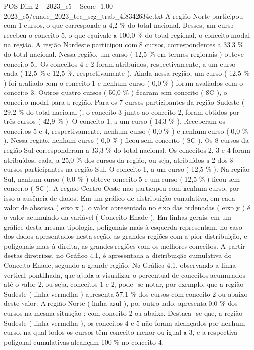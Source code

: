 \begin{textsample}{POS Dim 2 – 2023\_c5 – Score -1.00 – 2023\_c5/enade\_2023\_tec\_seg\_trab\_4f8342634e.txt}
A região Norte participou com 1 cursos, o que corresponde a 4,2 \% do total nacional.
Desses, um curso recebeu o conceito 5, o que equivale a 100,0 \% do total regional, o conceito modal na região.
A região Nordeste participou com 8 cursos, correspondentes a 33,3 \% do total nacional.
Nessa região, um curso ( 12,5 \% em termos regionais ) obteve conceito 5,.
Os conceitos 4 e 2 foram atribuídos, respectivamente, a um curso cada ( 12,5 \% e 12,5 \%, respectivamente ).
Ainda nessa região, um curso ( 12,5 \% ) foi avaliado com o conceito 1 e nenhum curso ( 0,0 \% ) foram avaliados com o conceito 3.
Outros quatro cursos ( 50,0 \% ) ficaram sem conceito ( SC ), o conceito modal para a região.
Para os 7 cursos participantes da região Sudeste ( 29,2 \% do total nacional ), o conceito 3 junto ao conceito 2, foram obtidos por três cursos ( 42,9 \% ).
O conceito 1, a um curso ( 14,3 \% ).
Receberam os conceitos 5 e 4, respectivamente, nenhum curso ( 0,0 \% ) e nenhum curso ( 0,0 \% ).
Nessa região, nenhum curso ( 0,0 \% ) ficou sem conceito ( SC ).
Os 8 cursos da região Sul corresponderam a 33,3 \% do total nacional.
Os conceitos 2, 3 e 4 foram atribuídos, cada, a 25,0 \% dos cursos da região, ou seja, atribuídos a 2 dos 8 cursos participantes na região Sul.
O conceito 1, a um curso ( 12,5 \% ).
Na região Sul, nenhum curso ( 0,0 \% ) obteve conceito 5 e um curso ( 12,5 \% ) ficou sem conceito ( SC ).
A região Centro-Oeste não participou com nenhum curso, por isso a ausência de dados.
Em um gráfico de distribuição cumulativa, em cada valor de abscissa ( eixo x ), o valor apresentado no eixo das ordenadas ( eixo y ) é o valor acumulado da variável ( Conceito Enade ).
Em linhas gerais, em um gráfico desta mesma tipologia, poligonais mais à esquerda representam, no caso dos dados apresentados nesta seção, as grandes regiões com a pior distribuição, e poligonais mais à direita, as grandes regiões com os melhores conceitos.
A partir destas diretrizes, no Gráfico 4.1, é apresentada a distribuição cumulativa do Conceito Enade, segundo a grande região.
No Gráfico 4.1, observando a linha vertical pontilhada, que ajuda a visualizar o percentual de conceitos acumulados até o valor 2, ou seja, conceitos 1 e 2, pode -se notar, por exemplo, que a região Sudeste ( linha vermelha ) apresenta 57,1 \% dos cursos com conceito 2 ou abaixo deste valor.
A região Norte ( linha azul ), por outro lado, apresenta 0,0 \% dos cursos na mesma situação : com conceito 2 ou abaixo.
Destaca -se que, a região Sudeste ( linha vermelha ), os conceitos 4 e 5 não foram alcançados por nenhum curso, na qual todos os cursos têm conceito menor ou igual a 3, e a respectiva poligonal cumulativas alcançam 100 \% no conceito 4.

\end{textsample}
